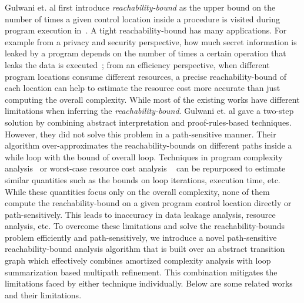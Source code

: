 
Gulwani et. al first introduce \emph{reachability-bound} as the upper bound on the number of times a given control location 
inside a procedure is visited during program execution in~\cite{GulwaniZ10}.
A tight reachability-bound has many applications.
For example from a privacy and security perspective,
how much secret information is leaked by a program depends on the number of times a certain operation that leaks the data
is executed~\cite{Malacaria07};
from an efficiency perspective, when different program locations consume different resources, a precise reachability-bound of each location can help to estimate the resource cost more accurate than just computing the overall complexity.
While most of the existing works have different limitations when inferring the \emph{reachability-bound}.
Gulwani et. al
gave a two-step solution by combining abstract interpretation and proof-rules-based techniques. However, they did not solve this problem in a path-sensitive manner.
Their algorithm over-approximates the reachability-bounds on different paths inside a while loop with the bound of overall loop.
Techniques in program complexity analysis~\cite{GustafssonEL05,HumenbergerJK18} 
or worst-case resource cost analysis
~\cite{BrockschmidtEFFG16,AlbertAGP08,AliasDFG10,Flores-MontoyaH14} can be repurposed to estimate similar quantities such as the
bounds on loop iterations, execution time, etc.
While these quantities focus only on  
the overall complexity,
none of them compute the reachability-bound on a given program control location directly or path-sensitively.
This leads to inaccuracy in data leakage analysis, resource analysis, etc.
To overcome these limitations and solve 
the reachability-bounds problem efficiently and path-sensitively, 
we introduce a novel path-sensitive reachability-bound analysis algorithm that is built over an abstract transition graph which effectively combines amortized complexity analysis with loop summarization based multipath refinement.
This combination mitigates the limitations faced by either technique individually. Below are some related works and their limitations.

